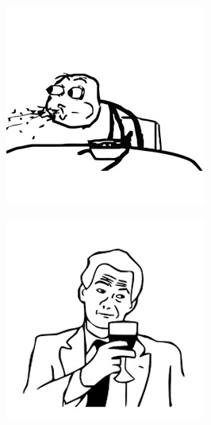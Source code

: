 \begin{multicols}{8}
\begin{center}
\includegraphics[width=\linewidth]{./IMG-GIT/MEMES/Meme-Faces-9.jpg}
\end{center}

\begin{center}
\includegraphics[width=\linewidth]{./IMG-GIT/MEMES/Meme-cara-True-Story.jpg}     
\end{center}


\end{multicols}
